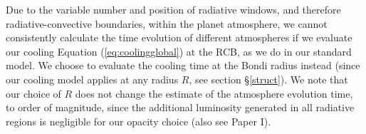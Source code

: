 \documentclass[apj]{emulateapj}
\newcommand{\delad}{\nabla_{\rm ad}}
\newcommand{\delrad}{\nabla_{\rm rad}}
\newcommand{\cb}{_{\rm RCB}}
\begin{document}
%
%
%
%

Due to the variable number and position of radiative windows, and therefore radiative-convective boundaries, within the planet atmosphere, we cannot consistently calculate the time evolution of different atmospheres if we evaluate our cooling Equation (\ref{eq:coolingglobal}) at the RCB, as we do in our standard model. We choose to evaluate the cooling time at the Bondi radius instead (since our cooling model applies at any radius $R$, see section \S\ref{struct}). We note that our choice of $R$ does not change the estimate of the atmosphere evolution time, to order of magnitude, since the additional luminosity generated in all radiative regions is negligible for our opacity choice (also see Paper I). 
\end{document}

